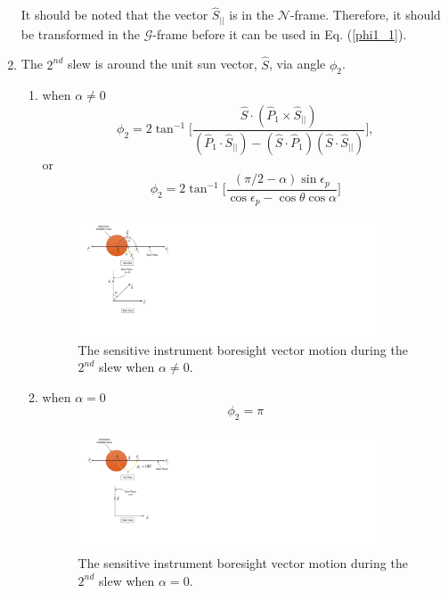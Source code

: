 \documentclass[letterpaper, paper,12pt]{AAS}		%
\begin{document}
\begin{enumerate}
		It should be noted that the vector $\hat{S}_{||}$ is in the $\mathcal{N}$-frame. Therefore, it should be transformed in the $\mathcal{G}$-frame before it can be used in Eq. (\ref{phi1_1}).
		\item The $2^{nd}$ slew is around the unit sun vector, $\hat{S}$, via angle $\phi_2$.
		\begin{enumerate}
			\item when $\alpha\neq0$
\begin{equation}
\phi_2=2\tan^{-1}\Big[ \frac{\hat{S}\cdot (\hat{P}_1\times\hat{S}_{||})}{(\hat{P}_1\cdot\hat{S}_{||})-(\hat{S}\cdot\hat{P}_1)(\hat{S}\cdot\hat{S}_{||})}\Big], 
\end{equation}
or
\begin{equation} 
\phi_2=2\tan^{-1}\Big[ \frac{(\pi/2-\alpha)\sin\epsilon_p}{\cos\epsilon_p-\cos\theta\cos\alpha}\Big]
\end{equation}
			\begin{figure}[H]
				\begin{center}
					\includegraphics[width=3.5in]{./Figures/SVAS_2r_modified}
					\caption{The sensitive instrument boresight vector motion during the $2^{nd}$ slew when $\alpha\neq 0$.}
				\end{center}
			\end{figure}
			
			\item when $\alpha=0$
			\begin{equation}
				\phi_2 = \pi
			\end{equation}
			\begin{figure}[H]
				\begin{center}
					\includegraphics[width=3.5in]{./Figures/SVAS_3r_modified}
						\caption{The sensitive instrument boresight vector motion during the $2^{nd}$ slew when $\alpha= 0$.}
				\end{center}
			\end{figure}
		\end{enumerate}
		

\end{enumerate}
\end{document}
